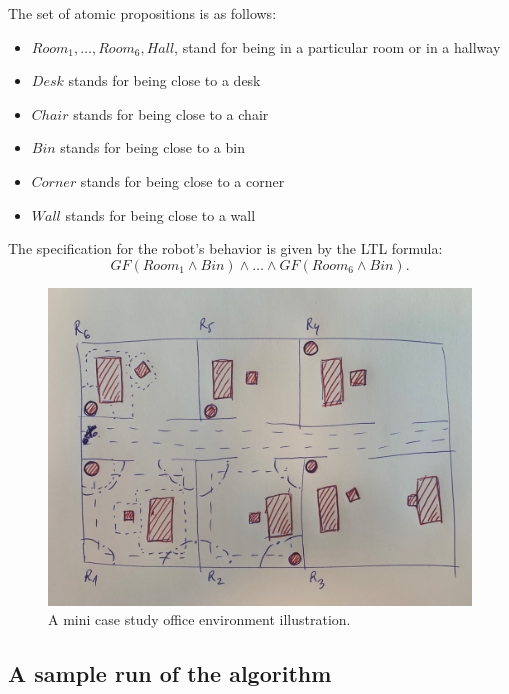 \documentclass{article}
\begin{document}
The set of atomic propositions is as follows:
\begin{itemize}
\item $\mathit{Room}_1,\ldots,\mathit{Room}_6, \mathit{Hall}$, stand for being in a particular room or in a hallway
\item $\mathit{Desk}$ stands for being close to a desk
\item $\mathit{Chair}$ stands for being close to a chair
\item $\mathit{Bin}$ stands for being close to a bin
\item $\mathit{Corner}$ stands for being close to a corner
\item $\mathit{Wall}$ stands for being close to a wall
\end{itemize}

The specification for the robot's behavior is given by the LTL formula:
$$G F (\mathit{Room}_1 \wedge \mathit{Bin}) \wedge \ldots \wedge G F (\mathit{Room}_6 \wedge \mathit{Bin}).$$

\begin{figure}
\centering
\includegraphics[width=\linewidth]{Fig/small-office} \caption{A mini case study office environment illustration.}
\label{fig:office}
\end{figure}

\subsection{A sample run of the algorithm}
\end{document}
